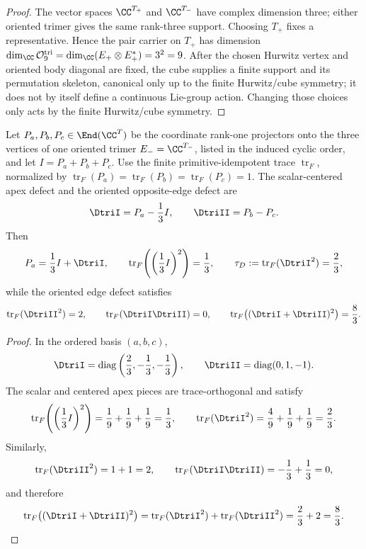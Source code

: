 \documentclass[11pt]{article}
\begin{document}
\begin{proof}
The vector spaces \(\CC^{T_+}\) and \(\CC^{T_-}\) have complex dimension three; either oriented trimer gives the same rank-three support.  Choosing \(T_+\) fixes a representative.
Hence the pair carrier on \(T_+\) has dimension
\(\dim_\CC\mathcal O_9^{\rm tri}=\dim_\CC(E_+\otimes E_+^*)=3^2=9\).  After the chosen Hurwitz vertex and oriented body diagonal are fixed, the cube
supplies a finite support and its permutation skeleton, canonical only up to the finite Hurwitz/cube symmetry; it does not by itself define a
continuous Lie-group action.  Changing those choices only acts by the finite
Hurwitz/cube symmetry.
\end{proof}



\begin{corollary}
\label{p1:cor:opposite-trimer-defects}
Let \(P_a,P_b,P_c\in\End(\CC^T)\) be the coordinate rank-one projectors onto the three vertices of one oriented trimer
\(E_-=\CC^{T_-}\), listed in the induced cyclic order, and let
\(I=P_a+P_b+P_c\).  Use the finite primitive-idempotent trace
\(\operatorname{tr}_F\), normalized by
\(\operatorname{tr}_F(P_a)=\operatorname{tr}_F(P_b)=\operatorname{tr}_F(P_c)=1\).
The scalar-centered apex defect and the oriented opposite-edge defect are
\[
    \DtriI=P_a-\frac13I,
    \qquad
    \DtriII=P_b-P_c.
\]
Then
\[
    P_a=\frac13I+\DtriI,
    \qquad
    \operatorname{tr}_F\!\left(\left(\frac13I\right)^2\right)=\frac13,
    \qquad
    \tau_D:=\operatorname{tr}_F({\DtriI}^2)=\frac23,
\]
while the oriented edge defect satisfies
\[
    \operatorname{tr}_F({\DtriII}^2)=2,
    \qquad
    \operatorname{tr}_F(\DtriI\DtriII)=0,
    \qquad
    \operatorname{tr}_F\!\left((\DtriI+\DtriII)^2\right)=\frac83.
\]
\end{corollary}

\begin{proof}
In the ordered basis \((a,b,c)\),
\[
    \DtriI=\operatorname{diag}\left(\frac23,-\frac13,-\frac13\right),
    \qquad
    \DtriII=\operatorname{diag}(0,1,-1).
\]
The scalar and centered apex pieces are trace-orthogonal and satisfy
\[
    \operatorname{tr}_F\!\left(\left(\frac13I\right)^2\right)=\frac19+\frac19+\frac19=\frac13,
    \qquad
    \operatorname{tr}_F({\DtriI}^2)=\frac49+\frac19+\frac19=\frac23.
\]
Similarly,
\[
    \operatorname{tr}_F({\DtriII}^2)=1+1=2,
    \qquad
    \operatorname{tr}_F(\DtriI\DtriII)=-\frac13+\frac13=0,
\]
and therefore
\[
    \operatorname{tr}_F\!\left((\DtriI+\DtriII)^2\right)
    =\operatorname{tr}_F({\DtriI}^2)+\operatorname{tr}_F({\DtriII}^2)
    =\frac23+2=\frac83.
\]
\end{proof}
\end{document}
